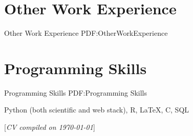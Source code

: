 \documentclass[a4paper,10pt,oneside]{article}
\newcommand{\CVNote}{CV compiled on {\today}}
\begin{document}
\begin{body}

\section
{Other Work\newline
Experience}
{Other Work Experience}
{PDF:OtherWorkExperience}



\section
{Programming Skills}
{Programming Skills}
{PDF:Programming Skills}

Python (both scientific and web stack),
R,
\LaTeX,
C, SQL

\end{body}


\begin{flushright}
\scriptsize%
[\textit{\CVNote}]%
\hspace{2.0mm}\null
\end{flushright}

\label{LastPage}~
\end{document}
